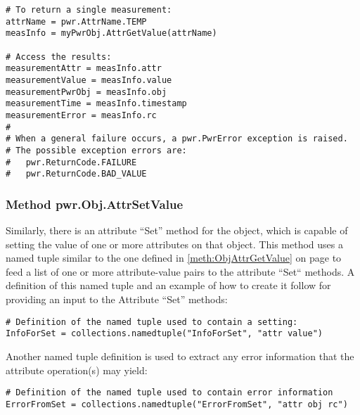 \begin{center}\begin{minipage}{.95\linewidth}\begin{lstlisting}
# To return a single measurement:
attrName = pwr.AttrName.TEMP
measInfo = myPwrObj.AttrGetValue(attrName)

# Access the results:
measurementAttr = measInfo.attr
measurementValue = measInfo.value
measurementPwrObj = measInfo.obj
measurementTime = measInfo.timestamp
measurementError = measInfo.rc
#
# When a general failure occurs, a pwr.PwrError exception is raised.
# The possible exception errors are:
#   pwr.ReturnCode.FAILURE
#   pwr.ReturnCode.BAD_VALUE
\end{lstlisting}\end{minipage}\end{center}

\subsubsection{Method pwr.Obj.AttrSetValue}
\label{meth:ObjAttrSetValue}

Similarly, there is an attribute ``Set'' method for the object, which is capable
of setting the value of one or more attributes on that object. This method
uses a named tuple similar to the one defined in
\ref{meth:ObjAttrGetValue} on page \pageref{meth:ObjAttrGetValue} to feed a
list of one or more attribute-value pairs to the attribute ``Set`` methods. A
definition of this named tuple and an example of how to create it follow for
providing an input to the Attribute ``Set'' methods:

\begin{center}\begin{minipage}{.95\linewidth}\begin{lstlisting}
# Definition of the named tuple used to contain a setting:
InfoForSet = collections.namedtuple("InfoForSet", "attr value")
\end{lstlisting}\end{minipage}\end{center}

Another named tuple definition is used to extract any error information
that the attribute operation(s) may yield:

\begin{center}\begin{minipage}{.95\linewidth}\begin{lstlisting}
# Definition of the named tuple used to contain error information
ErrorFromSet = collections.namedtuple("ErrorFromSet", "attr obj rc")
\end{lstlisting}\end{minipage}\end{center}

